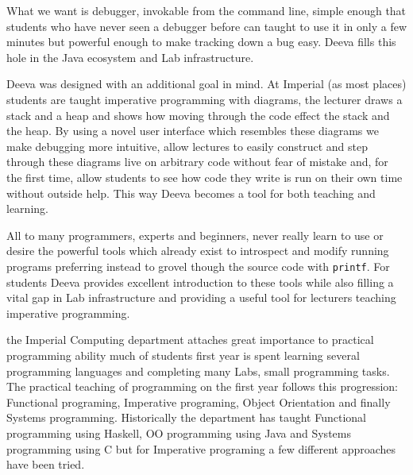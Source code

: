 \documentclass[11pt, a4paper]{article}
\newcommand{\cmd}[1]{{\tt #1}}
\begin{document}
What we want is debugger, invokable from the command line, simple enough that students who have never seen a debugger before can taught to use it in only a few minutes but powerful enough to make tracking down a bug easy. 
Deeva fills this hole in the Java ecosystem and Lab infrastructure.

Deeva was designed with an additional goal in mind.
At Imperial (as most places) students are taught imperative programming with diagrams, the lecturer draws a stack and a heap and shows how moving through the code effect the stack and the heap.
By using a novel user interface which resembles these diagrams we make debugging more intuitive, allow lectures to easily construct and step through these diagrams live on arbitrary code without fear of mistake and, for the first time, allow students to see how code they write is run on their own time without outside help.
This way Deeva becomes a tool for both teaching and learning.

All to many programmers, experts and beginners, never really learn to use or desire the powerful tools which already exist to introspect and modify running programs preferring instead to grovel though the source code with \cmd{printf}.
For students Deeva provides excellent introduction to these tools while also filling a vital gap in Lab infrastructure and providing a useful tool for lecturers teaching imperative programming.



% 

the Imperial Computing department attaches great importance to practical programming ability much of students first year is spent learning several programming languages and completing many Labs, small programming tasks. 
The practical teaching of programming on the first year follows this progression: Functional programing, Imperative programing, Object Orientation and finally Systems programming.
Historically the department has taught Functional programming using Haskell, OO programming using Java and Systems programming using C but for Imperative programing a few different approaches have been tried.
\end{document}
